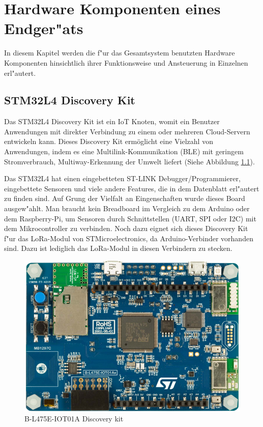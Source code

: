 \chapter{Hardware Komponenten eines Endger"ats}\label{Komponente}

In diesem Kapitel werden die f"ur das Gesamtsystem benutzten 
Hardware Komponenten hinsichtlich ihrer Funktionsweise und Ansteuerung 
in Einzelnen erl"autert. 

\section{STM32L4 Discovery Kit}\label{LoRa}

Das STM32L4 Discovery Kit ist ein IoT Knoten, womit ein Benutzer 
Anwendungen mit direkter Verbindung zu einem oder mehreren 
Cloud-Servern entwickeln kann.
Dieses Discovery Kit erm\"oglicht eine Vielzahl von Anwendungen, indem 
es eine Multilink-Kommunikation (\ac{BLE}) mit geringem 
Stromverbrauch, Multiway-Erkennung der Umwelt liefert (Siehe 
Abbildung \ref{Node}).

Das STM32L4 hat einen eingebetteten ST-LINK Debugger/Programmierer, 
eingebettete Sensoren und viele andere Features, die in dem Datenblatt 
erl"autert zu finden sind. Auf Grung der 
Vielfalt an Eingenschaften wurde dieses Board ausgew"ahlt. Man braucht 
kein Breadboard im Vergleich zu dem Arduino oder dem Raspberry-Pi, um 
Sensoren durch Schnittstellen (UART, \ac{SPI} oder I2C) mit dem 
Mikrocontroller zu verbinden. Noch dazu eignet sich dieses Discovery 
Kit f"ur das LoRa-Modul von STMicroelectronics, da Arduino-Verbinder 
vorhanden sind. Dazu ist lediglich das LoRa-Modul in diesen Verbindern zu stecken. 

\begin{figure}[h]
	\centering
	\includegraphics[width=12cm]{source/images/Board}
	\caption{B-L475E-IOT01A Discovery kit 
	\cite{B-L475E-IOT01A}}\label{Node}
\end{figure}

